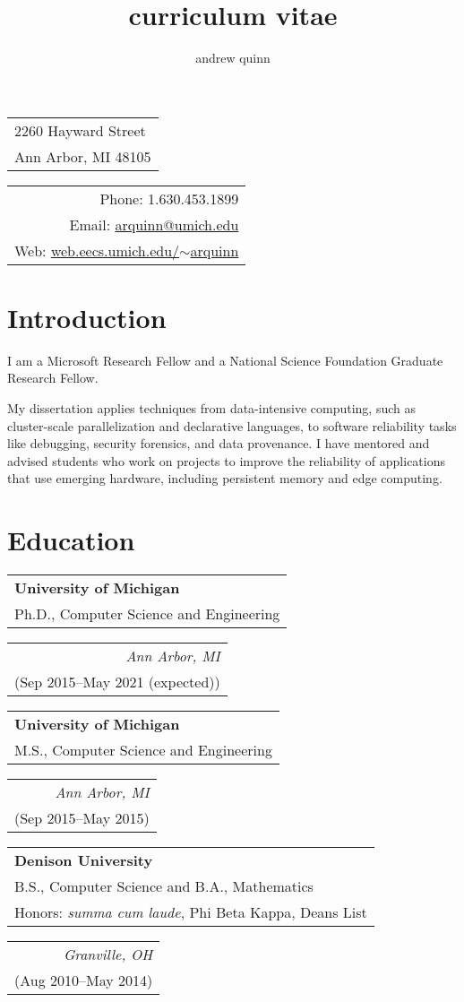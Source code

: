 \documentclass[letterpaper,10pt]{article}
\title{curriculum vitae}
\author{andrew quinn}
\makeatletter
\newcommand{\reitem}[2]{
  \begin{tabular}[t]{l}
    #2
  \end{tabular}
\hfill
\begin{tabular}[t]{r}
  #1
\end{tabular}
}
\newcommand{\quadItem}[4]{\reitem{\emph{#1}\\#2}{\textbf{#3}\\#4}}
\def \addr {2260 Hayward Street\\Ann Arbor, MI 48105}
\def \phone {1.630.453.1899}
\def \email {\href{mailto:arquinn@umich.edu}{arquinn@umich.edu}}
\def \website {\href{https://web.eecs.umich.edu/~arquinn}{web.eecs.umich.edu/$\sim$arquinn}}
\makeatother
\begin{document}
\maketitle
\setlength\parindent{0pt}
\setlength{\parskip}{3pt}


\begin{tabular}[t]{l}
  \addr
\end{tabular}
\hfill
\begin{tabular}[t]{r}
  Phone: \phone\\
  Email: \email\\
  Web: \website
\end{tabular}


\section{Introduction}

I am a Microsoft Research Fellow and a National Science Foundation Graduate
Research Fellow.

My dissertation applies techniques from data-intensive computing, such as
cluster-scale parallelization and declarative languages, to software reliability
tasks like debugging, security forensics, and data provenance.  I have mentored
and advised students who work on projects to improve the reliability of
applications that use emerging hardware, including persistent memory and edge
computing.

\section{Education}

\quadItem{Ann Arbor, MI}{(Sep 2015--May 2021 (expected))}{University of
  Michigan}{Ph.D., Computer Science and Engineering}

\quadItem{Ann Arbor, MI}{(Sep 2015--May 2015)}{University of Michigan}{M.S.,
  Computer Science and Engineering}

\quadItem{Granville, OH}{(Aug 2010--May 2014)}{Denison University}{B.S.,
  Computer Science and B.A., Mathematics\\ Honors: \textit{summa cum
    laude}, Phi Beta Kappa, Deans List}
\end{document}
